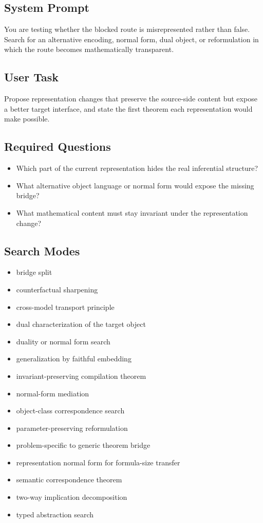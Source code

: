 \documentclass[11pt]{article}
\begin{document}
\subsection*{System Prompt}
You are testing whether the blocked route is misrepresented rather than false. Search for an alternative encoding, normal form, dual object, or reformulation in which the route becomes mathematically transparent.

\subsection*{User Task}
Propose representation changes that preserve the source-side content but expose a better target interface, and state the first theorem each representation would make possible.

\subsection*{Required Questions}
\begin{itemize}[leftmargin=*,itemsep=0.2em]
\item Which part of the current representation hides the real inferential structure?
\item What alternative object language or normal form would expose the missing bridge?
\item What mathematical content must stay invariant under the representation change?
\end{itemize}
\subsection*{Search Modes}
\begin{itemize}[leftmargin=*,itemsep=0.2em]
\item bridge split
\item counterfactual sharpening
\item cross-model transport principle
\item dual characterization of the target object
\item duality or normal form search
\item generalization by faithful embedding
\item invariant-preserving compilation theorem
\item normal-form mediation
\item object-class correspondence search
\item parameter-preserving reformulation
\item problem-specific to generic theorem bridge
\item representation normal form for formula-size transfer
\item semantic correspondence theorem
\item two-way implication decomposition
\item typed abstraction search
\end{itemize}
\end{document}

